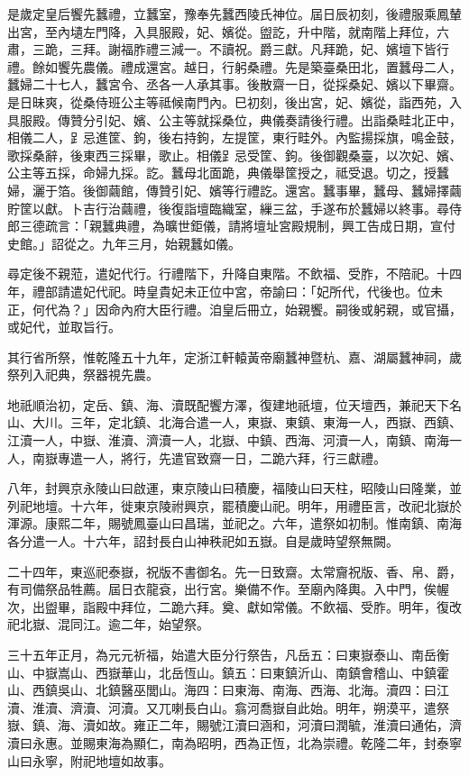 \begin{pinyinscope}
是歲定皇后饗先蠶禮，立蠶室，豫奉先蠶西陵氏神位。屆日辰初刻，後禮服乘鳳輦出宮，至內壝左門降，入具服殿，妃、嬪從。盥訖，升中階，就南階上拜位，六肅，三跪，三拜。謝福胙禮三減一。不讀祝。爵三獻。凡拜跪，妃、嬪壇下皆行禮。餘如饗先農儀。禮成還宮。越日，行躬桑禮。先是築臺桑田北，置蠶母二人，蠶婦二十七人，蠶宮令、丞各一人承其事。後散齋一日，從採桑妃、嬪以下畢齋。是日昧爽，從桑侍班公主等祗候南門內。巳初刻，後出宮，妃、嬪從，詣西苑，入具服殿。傳贊分引妃、嬪、公主等就採桑位，典儀奏請後行禮。出詣桑畦北正中，相儀二人，𧾷忌進筐、鉤，後右持鉤，左提筐，東行畦外。內監揚採旗，鳴金鼓，歌採桑辭，後東西三採畢，歌止。相儀𧾷忌受筐、鉤。後御觀桑臺，以次妃、嬪、公主等五採，命婦九採。訖。蠶母北面跪，典儀舉筐授之，祗受退。切之，授蠶婦，灑于箔。後御繭館，傳贊引妃、嬪等行禮訖。還宮。蠶事畢，蠶母、蠶婦擇繭貯筐以獻。卜吉行治繭禮，後復詣壇臨織室，繅三盆，手遂布於蠶婦以終事。尋侍郎三德疏言：「親蠶典禮，為曠世鉅儀，請將壇址宮殿規制，興工告成日期，宣付史館。」詔從之。九年三月，始親蠶如儀。

尋定後不親蒞，遣妃代行。行禮階下，升降自東階。不飲福、受胙，不陪祀。十四年，禮部請遣妃代祀。時皇貴妃未正位中宮，帝諭曰：「妃所代，代後也。位未正，何代為？」因命內府大臣行禮。洎皇后冊立，始親饗。嗣後或躬親，或官攝，或妃代，並取旨行。

其行省所祭，惟乾隆五十九年，定浙江軒轅黃帝廟蠶神暨杭、嘉、湖屬蠶神祠，歲祭列入祀典，祭器視先農。

地祇順治初，定岳、鎮、海、瀆既配饗方澤，復建地祇壇，位天壇西，兼祀天下名山、大川。三年，定北鎮、北海合遣一人，東嶽、東鎮、東海一人，西嶽、西鎮、江瀆一人，中嶽、淮瀆、濟瀆一人，北嶽、中鎮、西海、河瀆一人，南鎮、南海一人，南嶽專遣一人，將行，先遣官致齋一日，二跪六拜，行三獻禮。

八年，封興京永陵山曰啟運，東京陵山曰積慶，福陵山曰天柱，昭陵山曰隆業，並列祀地壇。十六年，徙東京陵祔興京，罷積慶山祀。明年，用禮臣言，改祀北嶽於渾源。康熙二年，賜號鳳臺山曰昌瑞，並祀之。六年，遣祭如初制。惟南鎮、南海各分遣一人。十六年，詔封長白山神秩祀如五嶽。自是歲時望祭無闕。

二十四年，東巡祀泰嶽，祝版不書御名。先一日致齋。太常齎祝版、香、帛、爵，有司備祭品牲薦。屆日衣龍袞，出行宮。樂備不作。至廟內降輿。入中門，俟幄次，出盥畢，詣殿中拜位，二跪六拜。奠、獻如常儀。不飲福、受胙。明年，復改祀北嶽、混同江。逾二年，始望祭。

三十五年正月，為元元祈福，始遣大臣分行祭告，凡岳五：曰東嶽泰山、南岳衡山、中嶽嵩山、西嶽華山，北岳恆山。鎮五：曰東鎮沂山、南鎮會稽山、中鎮霍山、西鎮吳山、北鎮醫巫閭山。海四：曰東海、南海、西海、北海。瀆四：曰江瀆、淮瀆、濟瀆、河瀆。又兀喇長白山。翕河喬嶽自此始。明年，朔漠平，遣祭嶽、鎮、海、瀆如故。雍正二年，賜號江瀆曰涵和，河瀆曰潤毓，淮瀆曰通佑，濟瀆曰永惠。並賜東海為顯仁，南為昭明，西為正恆，北為崇禮。乾隆二年，封泰寧山曰永寧，附祀地壇如故事。


\end{pinyinscope}
